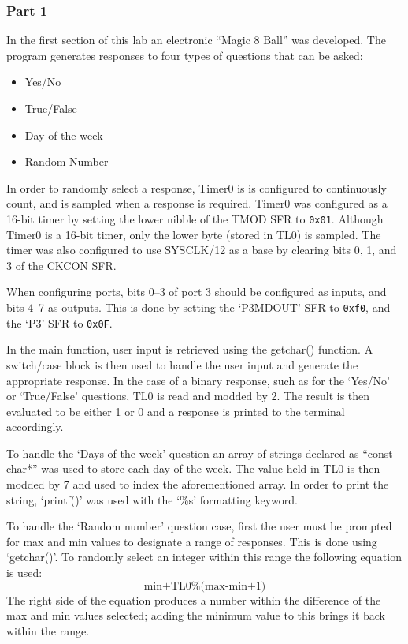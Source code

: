 \documentclass[12pt]{article}
\begin{document}
\subsubsection{Part 1}
In the first section of this lab an electronic ``Magic 8 Ball'' was developed. The program generates responses to four types of questions that can be asked:
	\begin{itemize}
		\item Yes/No
		\item True/False
		\item Day of the week
		\item Random Number
	\end{itemize}

In order to randomly select a response, Timer0 is is configured to continuously count, and is sampled when a response is required. Timer0 was configured as a 16-bit timer by setting the lower nibble of the TMOD SFR to \texttt{0x01}. Although Timer0 is a 16-bit timer, only the lower byte (stored in TL0) is sampled. The timer was also configured to use SYSCLK/12 as a base by clearing bits 0, 1, and 3 of the CKCON SFR. 

When configuring ports, bits 0--3 of port 3 should be configured as inputs, and bits 4--7 as outputs. This is done by setting the `P3MDOUT' SFR to \texttt{0xf0}, and the `P3' SFR to \texttt{0x0F}.

In the main function, user input is retrieved using the getchar() function. A switch/case block is then used to handle the user input and generate the appropriate response. In the case of a binary response, such as for the `Yes/No' or `True/False' questions, TL0 is read and modded by 2. The result is then evaluated to be either 1 or 0 and a response is printed to the terminal accordingly. 

To handle the `Days of the week' question an array of strings declared as ``const char*'' was used to store each day of the week. The value held in TL0 is then modded by 7 and used to index the aforementioned array. In order to print the string, `printf()' was used with the `\%s' formatting keyword. 

To handle the `Random number' question case, first the user must be prompted for max and min values to designate a range of responses. This is done using `getchar()'. To randomly select an integer within this range the following equation is used:
\begin{displaymath}
\text{min+TL0\%(max-min+1)}
\end{displaymath}
The right side of the equation produces a number within the difference of the max and min values selected; adding the minimum value to this brings it back within the range. 
\end{document}
